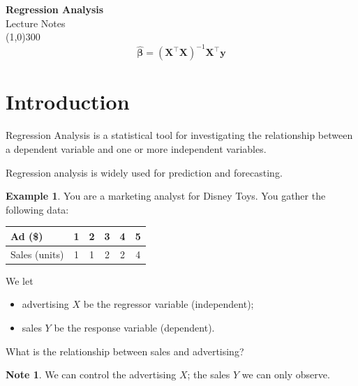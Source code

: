 \documentclass[11pt,a4paper]{article}
\numberwithin{equation}{section}
\theoremstyle{definition}
\newtheorem{exa}[thm]{Example}
\newtheorem*{note}{Note}
\begin{document}
\begin{titlepage}
\thispagestyle{empty}
\begin{center}
\vspace*{3cm}
{\Huge\bfseries Regression Analysis}\\[1.2cm]
{\large Lecture Notes}\\[2.5cm]
\line(1,0){300}\\[1.5cm]
$$\hat{\boldsymbol\beta} = (\mathbf{X}^\top \mathbf{X})^{-1} \mathbf{X}^\top \mathbf{y}$$
\end{center}
\end{titlepage}

\tableofcontents
\thispagestyle{empty}
\clearpage
\setcounter{page}{1}








\section{Introduction}
Regression Analysis is a statistical tool for investigating the relationship between a dependent variable and one or more independent variables.

Regression analysis is widely used for prediction and forecasting.


\begin{exa}\label{exa:disney}
You are a marketing analyst for Disney Toys. You gather the following data:
\begin{center}
\begin{tabular}{l|ccccc}
Ad (\$) & 1 & 2 & 3 & 4 & 5 \\
\hline
Sales (units) & 1 & 1 & 2 & 2 & 4 \\
\end{tabular}
\end{center}
We let
\begin{itemize}
\item advertising $X$ be the regressor variable (independent);
\item sales $Y$ be the response variable (dependent).
\end{itemize}
What is the relationship between sales and advertising?
\end{exa}

\begin{note}
We can control the advertising $X$; the sales $Y$ we can only observe.
\end{note}
\end{document}
